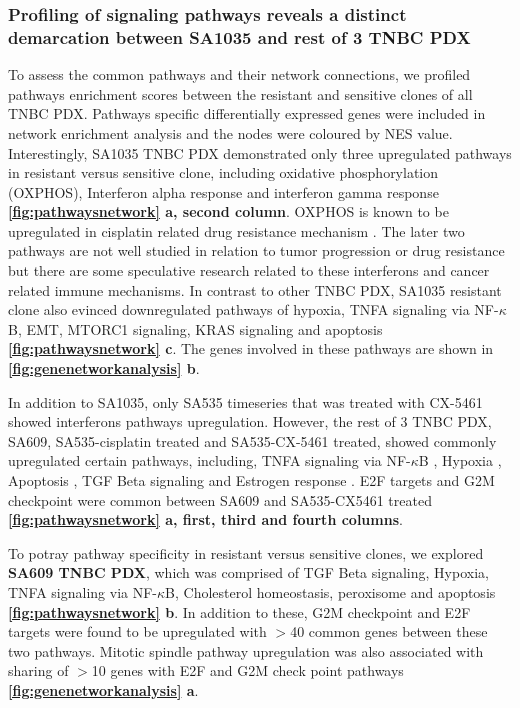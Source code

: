 \subsubsection{Profiling of signaling pathways reveals a distinct demarcation between SA1035 and rest of 3 TNBC PDX}
To assess the common pathways and their network connections, 
we profiled pathways enrichment scores between the resistant and sensitive clones of all TNBC PDX. 
Pathways specific differentially expressed genes were included in network enrichment analysis and the nodes were coloured by NES value. Interestingly, SA1035 TNBC PDX demonstrated only three upregulated pathways in resistant versus sensitive clone, including oxidative phosphorylation (OXPHOS), Interferon alpha response \cite{provance2019deciphering} and interferon gamma response \cite{mojic2018dark} \textbf{\autoref{fig:pathwaysnetwork} a, second column}. \ac{OXPHOS} is known to be upregulated in cisplatin related drug resistance mechanism \cite{lee2017myc}. The later two pathways are not well studied in relation to tumor progression or drug resistance but there are some speculative research related to these interferons and cancer related immune mechanisms. In contrast to other TNBC PDX, SA1035 resistant clone also evinced downregulated pathways of hypoxia, TNFA signaling via NF-$\kappa$B, \ac{EMT}, MTORC1 signaling, KRAS signaling and apoptosis {\textbf{\autoref{fig:pathwaysnetwork} c}}. The genes involved in these pathways are shown in \textbf{\autoref{fig:genenetworkanalysis} b}.

In addition to SA1035, only SA535 timeseries that was treated with CX-5461 showed interferons pathways upregulation. However, the rest of 3 TNBC PDX, SA609, SA535-cisplatin treated and SA535-CX-5461 treated, showed commonly upregulated certain pathways, including, TNFA signaling via NF-$\kappa$B \cite{lagunas2008nuclear,ito2015down, ryan2019targeting}, Hypoxia \cite{lee2012hypoxia, mcevoy2015identifying, deben2018hypoxia,li2019erk}, Apoptosis \cite{panaretakis2012cisplatin}, TGF Beta signaling \cite{zhang2019tgfbeta1} and Estrogen response \cite{zhu2018er}. E2F targets \cite{zheng2020upregulation} and G2M checkpoint \cite{visconti2016cell} were common between SA609 and SA535-CX5461 treated \textbf{\autoref{fig:pathwaysnetwork} a, first, third and fourth columns}. 

To potray pathway specificity in resistant versus sensitive clones, we explored \textbf{SA609 TNBC PDX}, which was  comprised of TGF Beta signaling, Hypoxia, TNFA signaling via NF-$\kappa$B, Cholesterol homeostasis, peroxisome and apoptosis \textbf{\autoref{fig:pathwaysnetwork} b}. In addition to these, G2M checkpoint and E2F targets were found to be upregulated with $>$40 common genes between these two pathways. Mitotic spindle pathway upregulation was also associated with sharing of $>$10 genes with E2F and G2M check point pathways \textbf{\autoref{fig:genenetworkanalysis} a}.

